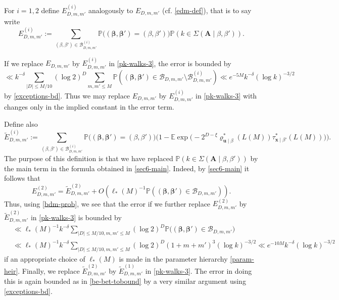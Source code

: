 \documentclass[11pt,reqno]{amsart}
\numberwithin{equation}{section}
\theoremstyle{definition}
\theoremstyle{remark}
\newcommand{\mb}{\mathbb}
\newcommand{\mbf}{\mathbf}
\def\boldbeta{\boldsymbol\beta}
\renewcommand{\le}{\leqslant}
\begin{document}
For $i = 1,2$ define $E^{(i)}_{D,m,m'}$ analogously to $E_{D,m,m'}$ (cf. \cref{edm-def}), that is to say 
write
\begin{equation*}E^{(i)}_{D,m,m'} := \sum_{(\beta,\beta') \in \mathscr{B}^{(i)}_{D,m,m'}} \mb{P}\big((\boldbeta,\boldbeta') = (\beta,\beta')\big)  \mb{P}(k \in \Sigma(\mbf{A} \mid \beta,\beta')).\end{equation*}

If we replace $E_{D,m,m'}$ by $E^{(i)}_{D,m,m'}$ in \cref{pk-walks-3}, the error is bounded by 
\begin{equation}\label{be-bet-tobound} \ll k^{-\delta} \sum_{|D| \le M/10} (\log 2)^D \sum_{m,m' \le M}  \mb{P} ((\boldbeta, \boldbeta') \in \mathscr{B}_{D,m,m'} \setminus \mathscr{B}^{(i)}_{D,m,m'}) \ll e^{-5M} k^{-\delta} (\log k)^{-3/2}\end{equation}
by \cref{exceptions-bd}. Thus we may replace $E_{D,m,m'}$ by $E^{(i)}_{D,m,m'}$ in \cref{pk-walks-3} with changes only in the implied constant in the error term. 

Define also
\begin{equation*} \tilde E^{(i)}_{D,m,m'} := \sum_{(\beta,\beta') \in \mathscr{B}^{(i)}_{D,m,m'}} \mb{P}\big((\boldbeta,\boldbeta') = (\beta,\beta')\big)  \Big( 1 - \mb{E} \exp\big({-}2^{D - \xi}  \varrho^*_{\mbf{u} \mid \beta}(L(M))\tau^*_{\mbf{x} \mid \beta'}(L(M))\big)\Big).\end{equation*}
The purpose of this definition is that we have replaced $\mb{P}(k \in \Sigma(\mbf{A} \mid \beta,\beta'))$ by the main term in the formula obtained in \cref{sec6-main}. Indeed, by \cref{sec6-main} it follows that 
\[ E^{(2)}_{D,m,m'} = \tilde E^{(2)}_{D,m,m'} + O(\ell_*(M)^{-1}  \mb{P}((\boldbeta,\boldbeta') \in \mathscr{B}_{D,m,m'} )). \]
 Thus, using \cref{bdm-prob}, we see that the error if we further replace $E^{(2)}_{D,m,m'}$ by $\tilde E^{(2)}_{D,m,m'}$ in \cref{pk-walks-3} is bounded by 
\begin{align*}
& \ll \ell_*(M)^{-1} k^{-\delta}\sum_{|D| \le M/10, m, m' \le M} (\log 2)^D \mb{P}\big( (\boldbeta,\boldbeta') \in \mathscr{B}_{D,m,m'}\big) \\ & 
  \ll \ell_*(M)^{-1} k^{-\delta}\sum_{|D| \le M/10, m, m' \le M} (\log 2)^D (1 + m + m')^{3} (\log k)^{-3/2} \ll e^{-10M} k^{-\delta}(\log k)^{-3/2}   
\end{align*}
if an appropriate choice of $\ell_*(M)$ is made in the parameter hierarchy \cref{param-heir}. Finally, we replace $\tilde E^{(2)}_{D,m,m'}$ by $\tilde E^{(1)}_{D,m,m'}$ in \cref{pk-walks-3}. The error in doing this is again bounded as in \cref{be-bet-tobound} by a very similar argument using \cref{exceptions-bd}.
\end{document}
